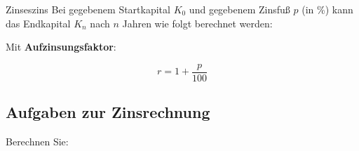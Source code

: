 \begin{gesetz}{Zinseszins}{}
Bei gegebenem Startkapital $K_0$ und gegebenem Zinsfuß $p$ (in \%) kann das Endkapital $K_n$ nach $n$ Jahren wie folgt berechnet werden:

\begin{center}\end{center}

Mit \textbf{Aufzinsungsfaktor}:

$$r = 1 + \frac{p}{100}$$
\end{gesetz}

\newpage

\subsection*{Aufgaben zur Zinsrechnung}

Berechnen Sie:

